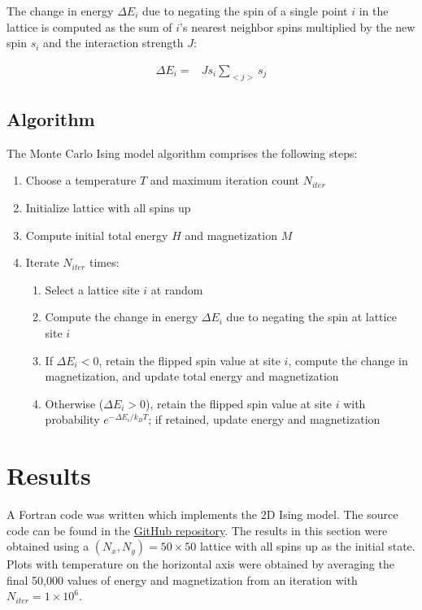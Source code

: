 \documentclass[]{article}
\begin{document}
The change in energy $\Delta E_i$ due to negating the spin of a single point $i$ in the lattice is computed as the sum of $i$'s nearest neighbor spins multiplied by the new spin $s_i$ and the interaction strength $J$:

\begin{align}
\Delta E_i =& J s_i \sum_{<j>} s_j
\end{align}

\subsection{\label{sec:alg}Algorithm}

The Monte Carlo Ising model algorithm comprises the following steps:

\begin{enumerate}
 \item Choose a temperature $T$ and maximum iteration count $N_{iter}$
 \item Initialize lattice with all spins up
 \item Compute initial total energy $H$ and magnetization $M$
 \item Iterate $N_{iter}$ times:
 \begin{enumerate}
  \item Select a lattice site $i$ at random
  \item Compute the change in energy $\Delta E_i$ due to negating the spin at lattice site $i$
  \item If $\Delta E_i < 0$, retain the flipped spin value at site $i$, compute the change in magnetization, and update total energy and magnetization
  \item Otherwise ($\Delta E_i > 0$), retain the flipped spin value at site $i$ with probability $e^{-\Delta E_i / k_B T}$; if retained, update energy and magnetization
 \end{enumerate}
\end{enumerate}

\section{\label{sec:res}Results}

A Fortran code was written which implements the 2D Ising model. The source code can be found in the \href{https://github.com/hugheyst/ising}{GitHub repository}. The results in this section were obtained using a $(N_x,N_y) = 50 \times 50$ lattice with all spins up as the initial state. Plots with temperature on the horizontal axis were obtained by averaging the final 50,000 values of energy and magnetization from an iteration with $N_{iter} = 1 \times 10^6$.
\end{document}

